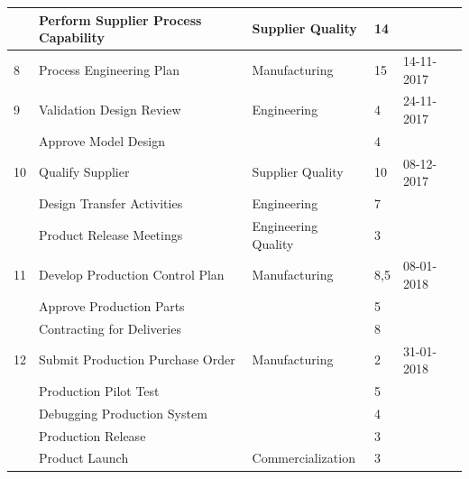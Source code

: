 \begin{landscape}
\begin{table}[!h]
\begin{tabular}{lllll}
          & Perform Supplier Process Capability   & Supplier Quality    & 14                   &             \\\hline
8         & Process Engineering Plan              & Manufacturing       & 15                   & 14-11-2017  \\\hline
9         & Validation Design Review              & Engineering         & 4                    & 24-11-2017  \\
          & Approve Model Design                  &                     & 4                    &             \\\hline
10        & Qualify Supplier                      & Supplier Quality    & 10                   & 08-12-2017  \\
          & Design Transfer Activities            & Engineering         & 7                    &             \\
          & Product Release Meetings              & Engineering Quality & 3                    &             \\\hline
11        & Develop Production Control Plan       & Manufacturing       & 8,5                  & 08-01-2018  \\
          & Approve Production Parts              &                     & 5                    &             \\
          & Contracting for Deliveries            &                     & 8                    &             \\\hline
12        & Submit Production Purchase Order      & Manufacturing       & 2                    & 31-01-2018  \\
          & Production Pilot Test                 &                     & 5                    &             \\
          & Debugging Production System           &                     & 4                    &             \\
          & Production Release                    &                     & 3                    &             \\
          & Product Launch                        & Commercialization   & 3                    &             \\
\end{tabular}
\end{table}

\end{landscape}


